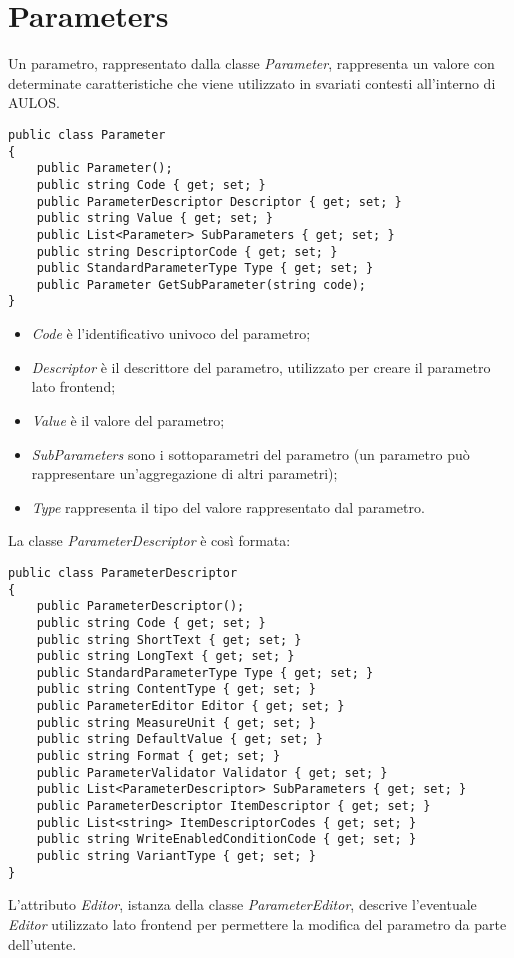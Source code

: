 \section{Parameters}

Un parametro, rappresentato dalla classe \textit{Parameter}, rappresenta un valore con determinate caratteristiche che viene utilizzato in svariati contesti all'interno di AULOS.
\begin{lstlisting}[caption={Parameter.cs},style=sharpCode]
public class Parameter
{
    public Parameter();
    public string Code { get; set; }
    public ParameterDescriptor Descriptor { get; set; }
    public string Value { get; set; }
    public List<Parameter> SubParameters { get; set; }
    public string DescriptorCode { get; set; }
    public StandardParameterType Type { get; set; }
    public Parameter GetSubParameter(string code);
}
\end{lstlisting}
\begin{itemize}
\item \textit{Code} è l'identificativo univoco del parametro;
\item \textit{Descriptor} è il descrittore del parametro, utilizzato per creare il parametro lato frontend;
\item \textit{Value} è il valore del parametro;
\item \textit{SubParameters} sono i sottoparametri del parametro (un parametro può rappresentare un'aggregazione di altri parametri);
\item \textit{Type} rappresenta il tipo del valore rappresentato dal parametro.
\end{itemize}
La classe \textit{ParameterDescriptor} è così formata:
\begin{lstlisting}[caption={ParameterDescriptor.cs},style=sharpCode]
public class ParameterDescriptor
{
    public ParameterDescriptor();        
    public string Code { get; set; }
    public string ShortText { get; set; }
    public string LongText { get; set; }
    public StandardParameterType Type { get; set; }
    public string ContentType { get; set; }
    public ParameterEditor Editor { get; set; }
    public string MeasureUnit { get; set; }
    public string DefaultValue { get; set; }
    public string Format { get; set; }
    public ParameterValidator Validator { get; set; }
    public List<ParameterDescriptor> SubParameters { get; set; }
    public ParameterDescriptor ItemDescriptor { get; set; }
    public List<string> ItemDescriptorCodes { get; set; }
    public string WriteEnabledConditionCode { get; set; }
    public string VariantType { get; set; }
}
\end{lstlisting}
L'attributo \textit{Editor}, istanza della classe \textit{ParameterEditor}, descrive l'eventuale \textit{Editor} utilizzato lato frontend per permettere la modifica del parametro da parte dell'utente.


